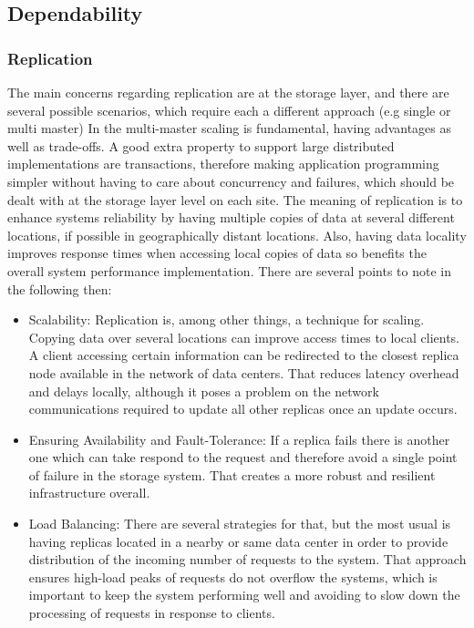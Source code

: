 \subsection{Dependability}
	\subsubsection{Replication} %
	The main concerns regarding replication are at the storage layer, and there are several possible scenarios, which require each a different approach (e.g single or multi master) In the multi-master scaling is fundamental, having advantages as well as trade-offs. A good extra property to support large distributed implementations are transactions, therefore making application programming simpler without having to care about concurrency and failures, which should be dealt with at the storage layer level on each site.	
	The meaning of replication is to enhance systems reliability by having multiple copies of data at several different locations, if possible in geographically distant locations. Also, having data locality improves response times when accessing local copies of data so benefits the overall system performance implementation. There are several points to note in the following then:

\begin{itemize}
	\item{Scalability:}
	Replication is, among other things, a technique for scaling. Copying data over several locations can improve access times to local clients. A client accessing certain information can be redirected to the closest replica node available in the network of data centers. That reduces latency overhead and delays locally, although it poses a problem on the network communications required to update all other replicas once an update occurs.

	\item{Ensuring Availability and Fault-Tolerance:}
	If a replica fails there is another one which can take respond to the request and therefore avoid a single point of failure in the storage system. That creates a more robust and resilient infrastructure overall.

	\item{Load Balancing:}
	There are several strategies for that, but the most usual is having replicas located in a nearby or same data center in order to provide distribution of the incoming number of requests to the system. That approach ensures high-load peaks of requests do not overflow the systems, which is important to keep the system performing well and avoiding to slow down the processing of requests in response to clients.
\end{itemize}
	

